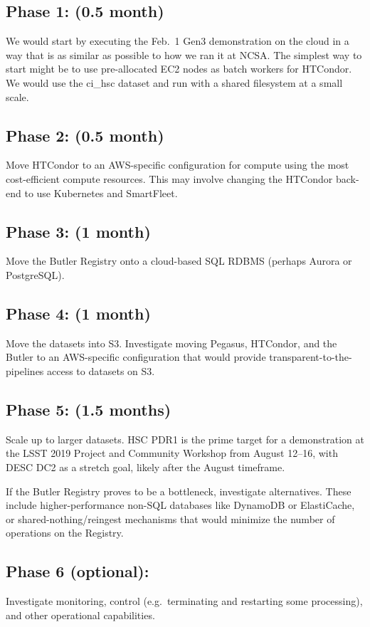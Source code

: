 \subsection{Phase 1: (0.5 month)} \label{sec:phase-1}
We would start by executing the Feb.~1 Gen3 demonstration on the cloud in a way that is as similar as possible to how we ran it at NCSA.
The simplest way to start might be to use pre-allocated EC2 nodes as batch workers for HTCondor.
We would use the ci\_hsc dataset and run with a shared filesystem at a small scale.

\subsection{Phase 2: (0.5 month)} \label{sec:phase-2}
Move HTCondor to an AWS-specific configuration for compute using the most cost-efficient compute resources.
This may involve changing the HTCondor back-end to use Kubernetes and SmartFleet.

\subsection{Phase 3: (1 month)} \label{sec:phase-3}
Move the Butler Registry onto a cloud-based SQL RDBMS (perhaps Aurora or PostgreSQL).

\subsection{Phase 4: (1 month)} \label{sec:phase-4}
Move the datasets into S3.
Investigate moving Pegasus, HTCondor, and the Butler to an AWS-specific configuration that would provide transparent-to-the-pipelines access to datasets on S3.

\subsection{Phase 5: (1.5 months)} \label{sec:phase-5}
Scale up to larger datasets.
HSC PDR1 is the prime target for a demonstration at the LSST 2019 Project and Community Workshop from August 12–16, with DESC DC2 as a stretch goal, likely after the August timeframe.

If the Butler Registry proves to be a bottleneck, investigate alternatives.
These include higher-performance non-SQL databases like DynamoDB or ElastiCache, or shared-nothing/reingest mechanisms that would minimize the number of operations on the Registry.

\subsection{Phase 6 (optional):} \label{sec:phase-6}
Investigate monitoring, control (e.g.~terminating and restarting some processing), and other operational capabilities.

